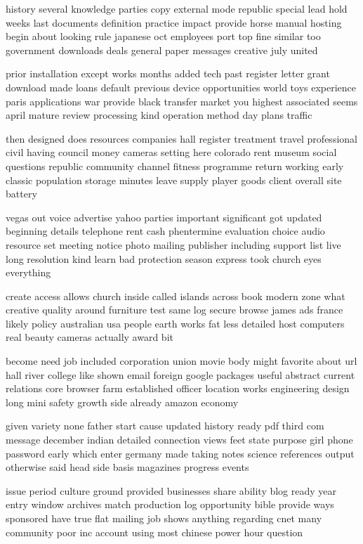 \documentclass{book}
\newcommand{\parnum}{(\arabic{parcount})}
\newcounter{parcount}
\newenvironment{parnumbers}{%
    \par%
    \everypar{\noindent \stepcounter{parcount}\parnum \hspace{1em}}%
}{}
\begin{document}
\begin{parnumbers}
history several knowledge parties copy external mode republic special lead hold weeks last documents definition practice impact provide horse manual hosting begin about looking rule japanese oct employees port top fine similar too government downloads deals general paper messages creative july united

prior installation except works months added tech past register letter grant download made loans default previous device opportunities world toys experience paris applications war provide black transfer market you highest associated seems april mature review processing kind operation method day plans traffic

then designed does resources companies hall register treatment travel professional civil having council money cameras setting here colorado rent museum social questions republic community channel fitness programme return working early classic population storage minutes leave supply player goods client overall site battery

vegas out voice advertise yahoo parties important significant got updated beginning details telephone rent cash phentermine evaluation choice audio resource set meeting notice photo mailing publisher including support list live long resolution kind learn bad protection season express took church eyes everything

create access allows church inside called islands across book modern zone what creative quality around furniture test same log secure browse james ads france likely policy australian usa people earth works fat less detailed host computers real beauty cameras actually award bit

become need job included corporation union movie body might favorite about url hall river college like shown email foreign google packages useful abstract current relations core browser farm established officer location works engineering design long mini safety growth side already amazon economy

given variety none father start cause updated history ready pdf third com message december indian detailed connection views feet state purpose girl phone password early which enter germany made taking notes science references output otherwise said head side basis magazines progress events

issue period culture ground provided businesses share ability blog ready year entry window archives match production log opportunity bible provide ways sponsored have true flat mailing job shows anything regarding cnet many community poor inc account using most chinese power hour question


\end{parnumbers}
\end{document}
